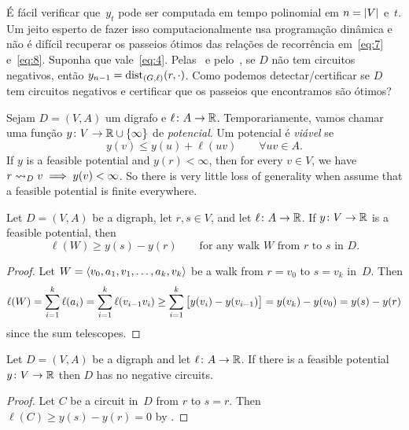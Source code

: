 \documentclass[10pt,reqno]{amsart}
\begin{document}
É fácil verificar que~\(y_t\) pode ser computada em tempo polinomial em
\(n = \card{V}\) e~\(t\). Um jeito esperto de fazer isso computacionalmente
usa programação dinâmica e não é difícil recuperar os passeios ótimos das
relações de recorrência em~\eqref{eq:7} e~\eqref{eq:8}.
Suponha que vale~\eqref{eq:4}. Pelas~
e pelo~, se \(D\) não tem circuitos negativos, então
\(y_{n-1} = \dist_{(G,\ell)}(r,\cdot)\). Como podemos detectar/certificar
se \(D\) tem circuitos negativos e certificar que os passeios que encontramos
são ótimos?

Sejam \(D = (V,A)\) um digrafo e \(\ell \colon A \to \Reals\).
Temporariamente, vamos chamar uma função
\(y \colon V \to \Reals \cup \set{\infty}\) de \emph{potencial}. Um
potencial é \emph{viável} se
\begin{equation*}
  y(v) \leq y(u) + \ell(uv) \qquad \forall uv \in A.
\end{equation*}
If \(y\) is a feasible potential and \(y(r) < \infty\), then for every
\(v \in V\), we have \(r \reaches_D v \implies y(v) < \infty\).  So
there is very little loss of generality when assume that a feasible
potential is finite everywhere.

\begin{theorem}
  \label{thm:2}
  Let \(D = (V,A)\) be a digraph, let \(r,s \in V\), and let
  \(\ell \colon A \to \Reals\).  If \(y \colon V \to \Reals\) is a
  feasible potential, then
  \begin{equation}
    \label{eq:11}
    \ell(W) \geq y(s) - y(r)
    \qquad
    \text{for any walk~\(W\) from~\(r\) to~\(s\) in~\(D\)}.
  \end{equation}
\end{theorem}
\begin{proof}
  Let \(W = \seq{v_0,a_1,v_1,\dotsc,a_k,v_k}\) be a walk from
  \(r = v_0\) to \(s = v_k\) in~\(D\).  Then
  \begin{equation*}
    \ell(W)
    =
    \sum_{i=1}^k \ell(a_i)
    =
    \sum_{i=1}^k \ell(v_{i-1}v_i)
    \geq
    \sum_{i=1}^k \sqbrac[\big]{y(v_i)-y(v_{i-1})}
    =
    y(v_k) - y(v_0)
    =
    y(s) - y(r)
  \end{equation*}
  since the sum telescopes.
\end{proof}

\begin{corollary}  Let \(D = (V,A)\) be a digraph and let \(\ell \colon A \to \Reals\).
  If there is a feasible potential \(y \colon V \to \Reals\) then
  \(D\) has no negative circuits.
\end{corollary}
\begin{proof}
  Let \(C\) be a circuit in~\(D\) from \(r\) to \(s = r\).  Then
  \(\ell(C) \geq y(s) - y(r) = 0\) by .
\end{proof}
\end{document}
